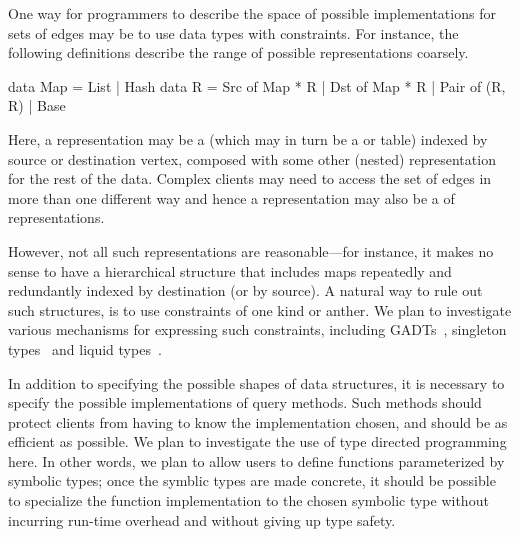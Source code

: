 One way for programmers to describe the space of possible
implementations for sets of edges may be to use data types with
constraints.  For instance, the following definitions describe the
range of possible representations  coarsely.

\begin{mylisting}
data Map = List | Hash
data R = Src of Map * R | Dst of Map * R | Pair of (R, R) | Base
\end{mylisting}

Here, a representation  may be a  (which may in turn
be a  or  table) indexed by source
or destination vertex, composed with some other (nested) representation
for the rest of the data.  Complex clients may need to access the set of
edges in more than one different way and hence a representation may also
be a  of representations.

However, not all such representations are reasonable---for instance,
it makes no sense to have a hierarchical structure that includes
maps repeatedly and redundantly indexed by destination (or by source).
A natural way to rule out such structures, is to use constraints of
one kind or anther.  We plan to investigate various mechanisms for
expressing such constraints, including GADTs~\cite{gadts},
singleton types~\cite{weirich:singletons} and 
liquid types~\cite{liquid-haskell}.

In addition to specifying the possible shapes of data structures,
it is necessary to specify the possible implementations of query
methods.  Such methods should protect clients from having to know
the implementation chosen, and should be as efficient as possible.
We plan to investigate the use of type directed programming here.
In other words, we plan to allow users to define functions parameterized
by symbolic types; once the symblic types are made concrete, it should
be possible to specialize the function implementation to the chosen
symbolic type without incurring run-time overhead and without giving up
type safety. 





